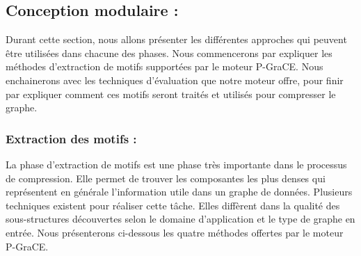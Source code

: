 \documentclass[a4paper,oneside,12pt]{report}
\theoremstyle{definition}
\begin{document}
		\subsection{Conception modulaire :}
		
		Durant cette section, nous allons présenter les différentes approches qui peuvent être utilisées dans chacune des phases. Nous commencerons par expliquer les méthodes d'extraction de motifs supportées par le moteur P-GraCE. Nous enchainerons avec les techniques d'évaluation que notre moteur offre, pour finir par expliquer comment ces motifs seront traités et utilisés pour compresser le graphe. 	
		
		
		\subsubsection{Extraction des motifs :}

La phase d'extraction de motifs est une phase très importante	 dans le processus de compression. Elle permet de trouver les composantes les plus denses qui représentent en générale l'information utile dans un graphe de données. Plusieurs techniques existent pour réaliser cette tâche. Elles diffèrent dans la qualité des sous-structures découvertes selon le domaine d'application et le type de graphe en entrée. Nous présenterons ci-dessous les quatre méthodes offertes par le moteur P-GraCE.
		
\end{document}
